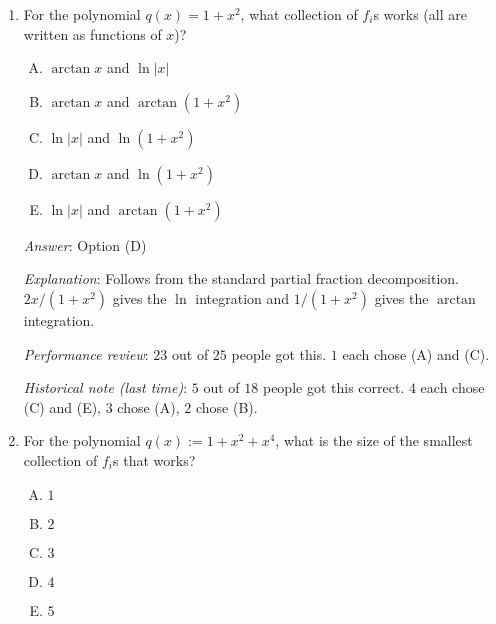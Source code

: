 \documentclass[10pt]{amsart}
\begin{document}
\begin{enumerate}
  {\em Performance review}: $9$ out of $25$ people got tihs. $13$
  chose (D), $2$ chose (C), $1$ chose (B).

  {\em Historical note (last time)}: $3$ out of $18$ people
  got this correct. $7$ chose (D), $5$ chose (B), $2$ chose (C), $1$
  chose (A).

  Those who chose (D) had the right idea but failed to account for the
  extra margin that needs to be maintained because an integration is
  being performed.

  For the next two questions, build on the observation: For any
  nonconstant monic polynomial $q(x)$, there exists a finite
  collection of transcendental functions $f_1, f_2, \dots, f_r$ such
  that the antiderivative of any rational function $p(x)/q(x)$, on an
  open interval where it is defined and continuous, can be expressed
  as $g_0 + f_1g_1 + f_2g_2 + \dots + f_rg_r$ where $g_0, g_1, \dots,
  g_r$ are rational functions.

\item For the polynomial $q(x) = 1 + x^2$, what collection of $f_i$s
  works (all are written as functions of $x$)?

  \begin{enumerate}[(A)]
  \item $\arctan x$ and $\ln|x|$
  \item $\arctan x$ and $\arctan(1 + x^2)$
  \item $\ln|x|$ and $\ln(1 + x^2)$ 
  \item $\arctan x$ and $\ln(1 + x^2)$
  \item $\ln|x|$ and $\arctan(1 + x^2)$
  \end{enumerate}

  {\em Answer}: Option (D)

  {\em Explanation}: Follows from the standard partial fraction
  decomposition. $2x/(1 + x^2)$ gives the $\ln$ integration and $1/(1
  + x^2)$ gives the $\arctan$ integration.

  {\em Performance review}: $23$ out of $25$ people got this. $1$ each
  chose (A) and (C).

  {\em Historical note (last time)}: $5$ out of $18$ people got this
  correct. $4$ each chose (C) and (E), $3$ chose (A), $2$ chose (B).

\item For the polynomial $q(x) := 1 + x^2 + x^4$, what is the
  size of the smallest collection of $f_i$s that works?

  \begin{enumerate}[(A)]
  \item $1$
  \item $2$
  \item $3$
  \item $4$
  \item $5$
  \end{enumerate}


\end{enumerate}
\end{document}
